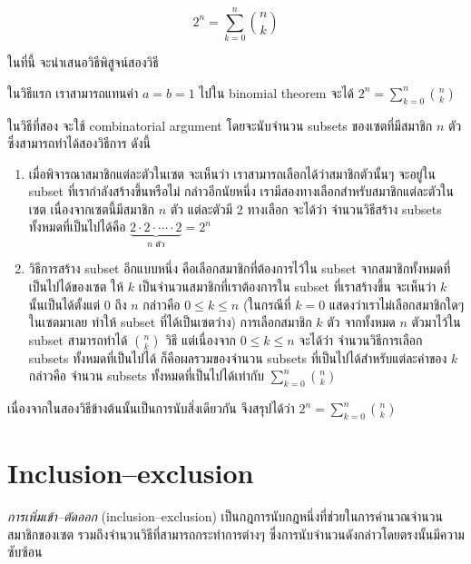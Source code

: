 \documentclass[a4paper,12pt,twoside]{article}
\begin{document}
\begin{corollary}
\[2^n=\sum_{k=0}^{n}{\binom{n}{k}}\]
\begin{pf}
ในที่นี้ จะนำเสนอวิธีพิสูจน์สองวิธี

ในวิธีแรก เราสามารถแทนค่า $a=b=1$ ไปใน binomial theorem จะได้ $2^n=\sum_{k=0}^{n}{\binom{n}{k}}$

ในวิธีที่สอง จะใช้ combinatorial argument โดยจะนับจำนวน subsets ของเซตที่มีสมาชิก $n$ ตัว ซึ่งสามารถทำได้สองวิธีการ ดังนี้
\begin{enumerate}[]
\item เมื่อพิจารณาสมาชิกแต่ละตัวในเซต จะเห็นว่า เราสามารถเลือกได้ว่าสมาชิกตัวนั้นๆ จะอยู่ใน subset ที่เรากำลังสร้างขึ้นหรือไม่ \enskip กล่าวอีกนัยหนึ่ง เรามีสองทางเลือกสำหรับสมาชิกแต่ละตัวในเซต \enskip เนื่องจากเซตนี้มีสมาชิก $n$ ตัว แต่ละตัวมี 2 ทางเลือก จะได้ว่า จำนวนวิธีสร้าง subsets ทั้งหมดที่เป็นไปได้คือ $\underbrace{2\cdot 2\cdot\cdots\cdot 2}_{\text{$n$ ตัว}}=2^n$
\item วิธีการสร้าง subset อีกแบบหนึ่ง คือเลือกสมาชิกที่ต้องการไว้ใน subset จากสมาชิกทั้งหมดที่เป็นไปได้ของเซต \enskip ให้ $k$ เป็นจำนวนสมาชิกที่เราต้องการใน subset ที่เราสร้างขึ้น \enskip จะเห็นว่า $k$ นั้นเป็นได้ตั้งแต่ 0 ถึง $n$ กล่าวคือ $0\leq k\leq n$ (ในกรณีที่ $k=0$ แสดงว่าเราไม่เลือกสมาชิกใดๆ ในเซตมาเลย ทำให้ subset ที่ได้เป็นเซตว่าง) \enskip การเลือกสมาชิก $k$ ตัว จากทั้งหมด $n$ ตัวมาไว้ใน subset สามารถทำได้ $\binom{n}{k}$ วิธี \enskip แต่เนื่องจาก $0\leq k\leq n$ จะได้ว่า จำนวนวิธีการเลือก subsets ทั้งหมดที่เป็นไปได้ ก็คือผลรวมของจำนวน subsets ที่เป็นไปได้สำหรับแต่ละค่าของ $k$ กล่าวคือ จำนวน subsets ทั้งหมดที่เป็นไปได้เท่ากับ $\sum_{k=0}^{n}{\binom{n}{k}}$
\end{enumerate}
เนื่องจากในสองวิธีข้างต้นนั้นเป็นการนับสิ่งเดียวกัน จึงสรุปได้ว่า $2^n=\sum_{k=0}^{n}{\binom{n}{k}}$
\end{pf}
\end{corollary}

\section{Inclusion--exclusion}
\emph{การเพิ่มเข้า--ตัดออก} (inclusion--exclusion) เป็นกฎการนับกฎหนึ่งที่ช่วยในการคำนวณจำนวนสมาชิกของเซต รวมถึงจำนวนวิธีที่สามารถกระทำการต่างๆ ซึ่งการนับจำนวนดังกล่าวโดยตรงนั้นมีความซับซ้อน

\newcommand\cnode[1]{\fbox{#1}}
\end{document}
